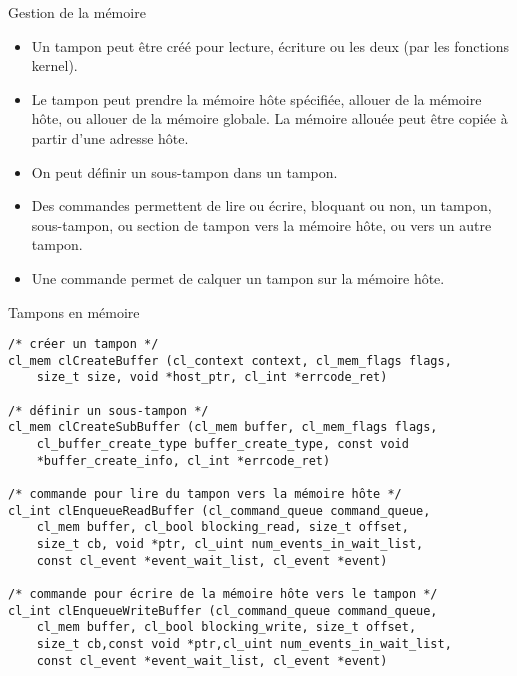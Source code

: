 \documentclass[10pt]{beamer}
\begin{document}
\begin{frame}{Gestion de la mémoire}

  \begin{itemize}
    \item Un tampon peut être créé pour lecture, écriture ou les deux (par les fonctions kernel).

    \item Le tampon peut prendre la mémoire hôte spécifiée, allouer de la mémoire hôte, ou allouer de la mémoire globale. La mémoire allouée peut être copiée à partir d'une adresse hôte.

    \item On peut définir un sous-tampon dans un tampon.

    \item Des commandes permettent de lire ou écrire, bloquant ou non, un tampon, sous-tampon, ou section de tampon vers la mémoire hôte, ou vers un autre tampon.

    \item Une commande permet de calquer un tampon sur la mémoire hôte.
  \end{itemize}
\end{frame}

\begin{frame}[fragile]{Tampons en mémoire}

  \scriptsize
  \begin{verbatim}
/* créer un tampon */
cl_mem clCreateBuffer (cl_context context, cl_mem_flags flags,
    size_t size, void *host_ptr, cl_int *errcode_ret)

/* définir un sous-tampon */
cl_mem clCreateSubBuffer (cl_mem buffer, cl_mem_flags flags,
    cl_buffer_create_type buffer_create_type, const void 
    *buffer_create_info, cl_int *errcode_ret)

/* commande pour lire du tampon vers la mémoire hôte */
cl_int clEnqueueReadBuffer (cl_command_queue command_queue,
    cl_mem buffer, cl_bool blocking_read, size_t offset,
    size_t cb, void *ptr, cl_uint num_events_in_wait_list,
    const cl_event *event_wait_list, cl_event *event)

/* commande pour écrire de la mémoire hôte vers le tampon */
cl_int clEnqueueWriteBuffer (cl_command_queue command_queue,
    cl_mem buffer, cl_bool blocking_write, size_t offset,
    size_t cb,const void *ptr,cl_uint num_events_in_wait_list, 
    const cl_event *event_wait_list, cl_event *event)
  \end{verbatim}
\end{frame}
\end{document}
